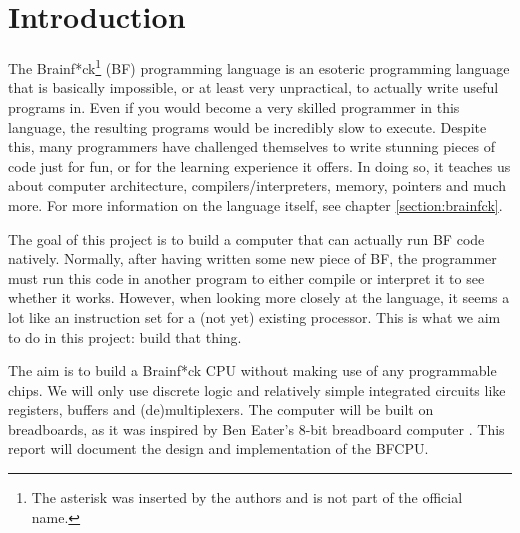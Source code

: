 \section{Introduction}
The Brainf*ck\footnote{The asterisk was inserted by the authors and is not part of the official name.} (BF) programming language is an esoteric programming language that is basically impossible, or at least very unpractical, to actually write useful programs in. Even if you would become a very skilled programmer in this language, the resulting programs would be incredibly slow to execute. Despite this, many programmers have challenged themselves to write stunning pieces of code just for fun, or for the learning experience it offers. In doing so, it teaches us about computer architecture, compilers/interpreters, memory, pointers and much more. For more information on the language itself, see chapter \ref{section:brainfck}.

The goal of this project is to build a computer that can actually run BF code natively. Normally, after having written some new piece of BF, the programmer must run this code in another program to either compile or interpret it to see whether it works. However, when looking more closely at the language, it seems a lot like an instruction set for a (not yet) existing processor. This is what we aim to do in this project: build that thing.

The aim is to build a Brainf*ck CPU without making use of any programmable chips. We will only use discrete logic and relatively simple integrated circuits like registers, buffers and (de)multiplexers. The computer will be built on breadboards, as it was inspired by Ben Eater's 8-bit breadboard computer \cite{beneater}. This report will document the design and implementation of the BFCPU.
